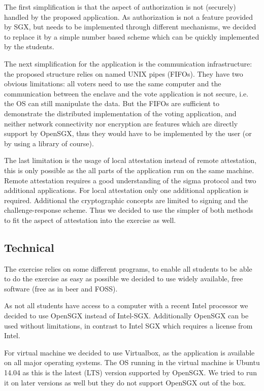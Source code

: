 \documentclass[DIN, pagenumber=false, fontsize=11pt, parskip=half]{scrartcl}
\begin{document}
    The first simplification is that the aspect of authorization is not (securely)
    handled by the proposed application. As authorization is not a feature provided
    by SGX, but needs to be implemented through different mechanisms, we decided
    to replace it by a simple number based scheme which can be quickly implemented
    by the students.

    The next simplification for the application is the communication infrastructure:
    the proposed structure relies on named UNIX pipes (FIFOs). They have two obvious
    limitations: all voters need to use the same computer and the communication
    between the enclave and the vote application is not secure, i.e. the OS can
    still manipulate the data. But the FIFOs are sufficient to demonstrate the distributed
    implementation of the voting application, and neither network connectivity nor
    encryption are features which are directly support by OpenSGX, thus they would have
    to be implemented by the user (or by using a library of course).

    The last limitation is the usage of local attestation instead of remote attestation,
    this is only possible as the all parts of the application run on the same machine.
    Remote attestation requires a good understanding of the sigma protocol and two 
    additional applications. For local attestation only one additional application
    is required. Additional the cryptographic concepts are limited to signing and
    the challenge-response scheme. Thus we decided to use the simpler of both methods
    to fit the aspect of attestation into the exercise as well.

    \subsection{Technical}
    The exercise relies on some different programs, to enable all students to be able
    to do the exercise as easy as possible we decided to use widely available,
    free software (free as in beer and FOSS).

    As not all students have access to a computer with a recent Intel processor
    we decided to use OpenSGX instead of Intel-SGX. Additionally OpenSGX can be
    used without limitations, in contrast to Intel SGX which requires a license
    from Intel.
    
    For virtual machine we decided to use Virtualbox, as the application is
    available on all major operating systems. The OS running in the virtual
    machine is Ubuntu 14.04 as this is the latest (LTS) version supported by
    OpenSGX. We tried to run it on later versions as well but they do not support
    OpenSGX out of the box.
\end{document}
